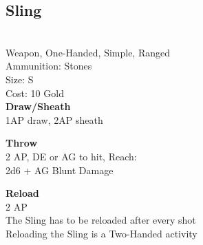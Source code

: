 \subsection{Sling}\label{weapon:sling}\\
Weapon, One-Handed, Simple, Ranged\\
Ammunition: Stones\\
Size: S\\
Cost: 10 Gold\\

\textbf{Draw/Sheath}\\
1AP draw, 2AP sheath

\textbf{Throw}\\
2 AP, DE or AG to hit,  Reach:\\
2d6 + \texttimes AG Blunt Damage

\textbf{Reload}\\
2 AP\\
The Sling has to be reloaded after every shot\\
Reloading the Sling is a Two-Handed activity
